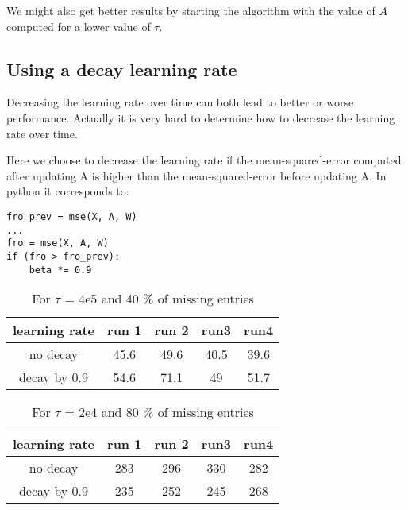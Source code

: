 \documentclass[a4paper, 11pt]{article}
\begin{document}
We might also get better results by starting the algorithm with the
value of $A$ computed for a lower value of $\tau$.

\subsection{Using a decay learning rate}

Decreasing the learning rate over time can both lead to better or
worse performance. Actually it is very hard to determine how to
decrease the learning rate over time.%

Here we choose to decrease the learning rate if the mean-squared-error
computed after updating A is higher than the mean-squared-error before
updating A. In python it corresponds to:

\begin{lstlisting}
fro_prev = mse(X, A, W)
...
fro = mse(X, A, W)
if (fro > fro_prev):
	beta *= 0.9
\end{lstlisting}

\begin{table}[h]
\centering
\begin{tabular}{|c|c|c|c|c|}
\hline
learning rate & run 1 & run 2 & run3 & run4 \\ \hline
no decay & 45.6 & 49.6 & 40.5 & 39.6 \\ \hline
decay by 0.9 & 54.6 & 71.1 & 49 & 51.7 \\ \hline
\end{tabular}
\caption{For $\tau$ = 4e5 and 40 \% of missing entries}
\label{tab:decay_learning_rate}
\end{table}

\begin{table}[h]
\centering
\begin{tabular}{|c|c|c|c|c|}
\hline
learning rate & run 1 & run 2 & run3 & run4 \\ \hline
no decay & 283 & 296 & 330 & 282 \\ \hline
decay by 0.9 & 235 & 252 & 245 & 268 \\ \hline
\end{tabular}
\caption{For $\tau$ = 2e4 and 80 \% of missing entries}
\label{tab:decay_learning_rate2}
\end{table}
\end{document}
